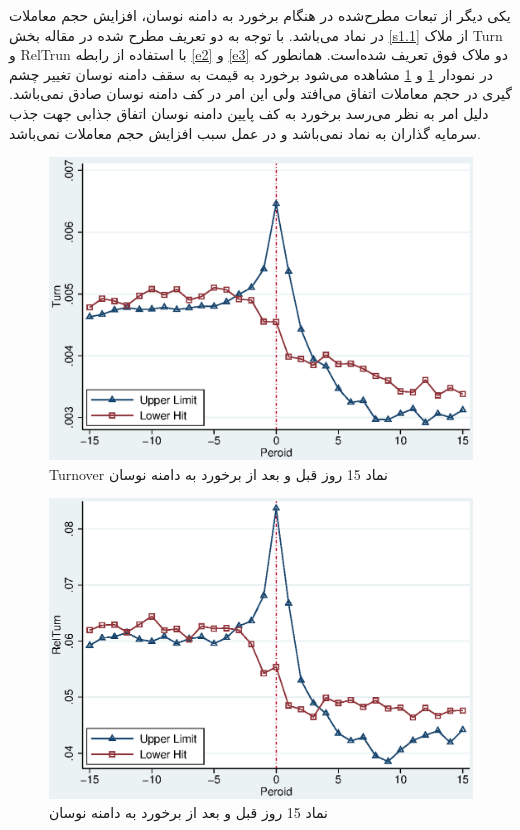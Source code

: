 \documentclass[12pt]{article}
\begin{document}
یکی دیگر از تبعات مطرح‌شده در هنگام برخورد به دامنه نوسان، افزایش حجم معاملات در نماد می‌باشد. با توجه به دو تعریف مطرح شده در مقاله بخش
\ref{s1.1}
از ملاک 
Turn
و
RelTrun
با استفاده از رابطه 
\ref{e2}
و
\ref{e3}
دو ملاک فوق تعریف شده‌است. همانطور که در نمودار 
\ref{g8}
و
\ref{g8}
مشاهده می‌شود برخورد به قیمت به سقف دامنه نوسان تغییر چشم گیری در حجم معاملات اتفاق می‌افتد ولی این امر در کف دامنه نوسان صادق نمی‌باشد. دلیل امر به نظر می‌رسد برخورد به کف پایین دامنه نوسان اتفاق جذابی جهت جذب سرمایه گذاران به نماد نمی‌باشد و در عمل سبب افزایش حجم معاملات نمی‌باشد.   



\begin{figure}[htbp]
\centering
\includegraphics[width=0.8\columnwidth]{T.eps}
\caption{Turnover نماد 15 روز قبل و بعد از برخورد به دامنه نوسان}
\label{g8}
\end{figure}

\begin{figure}[htbp]
\centering
\includegraphics[width=0.8\columnwidth]{RT.eps}
\caption{ نماد 15 روز قبل و بعد از برخورد به دامنه نوسان}
\label{g9}
\end{figure}
\FloatBarrier
\end{document}
